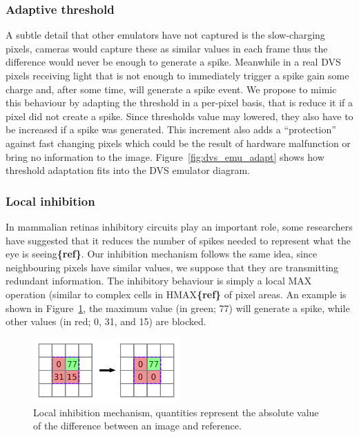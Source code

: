 \documentclass[twocolumn]{article}
\begin{document}
%

\subsubsection{Adaptive threshold} 
A subtle detail that other emulators have not captured is the slow-charging pixels, cameras would capture these as similar values in each frame thus the difference would never be enough to generate a spike. Meanwhile in a real DVS pixels receiving light that is not enough to immediately trigger a spike gain some charge and, after some time, will generate a spike event. We propose to mimic this behaviour by adapting the threshold in a per-pixel basis, that is reduce it if a pixel did not create a spike. Since thresholds value may lowered, they also have to be increased if a spike was generated. This increment also adds a ``protection'' against fast changing pixels which could be the result of hardware malfunction or bring no information to the image. Figure~\ref{fig:dvs_emu_adapt} shows how threshold adaptation fits into the DVS emulator diagram.

%


\subsubsection{Local inhibition} 
In mammalian retinas inhibitory circuits play an important role, some researchers have suggested that it reduces the number of spikes needed to represent what the eye is seeing\textbf{\{ref\}}. Our inhibition mechanism follows the same idea, since neighbouring pixels have similar values, we suppose that they are transmitting redundant information. The inhibitory behaviour is simply a local MAX operation (similar to complex cells in HMAX\textbf{\{ref\}} of pixel areas. An example is shown in Figure~\ref{fig:local_inh}, the maximum value (in green; 77) will generate a spike, while other values (in red; 0, 31, and 15) are blocked.

\begin{figure}[htb]

  \includegraphics[width=0.5\textwidth]{inh_local_max}
  \caption{Local inhibition mechanism, quantities represent the absolute value of the difference between an image and reference.}
  \label{fig:local_inh}
\end{figure}
\end{document}
